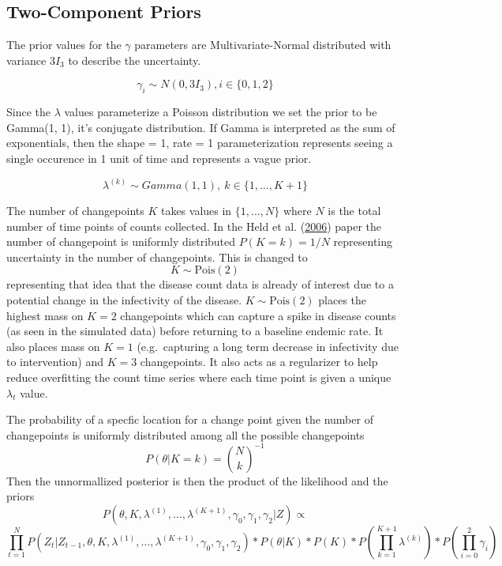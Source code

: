 \documentclass[]{article}
\numberwithin{equation}{section}
\begin{document}
\hypertarget{two-component-priors}{%
\subsection{Two-Component Priors}\label{two-component-priors}}

The prior values for the \(\gamma\) parameters are Multivariate-Normal
distributed with variance \(3I_3\) to describe the uncertainty.

\[\gamma_i \sim N(0, 3I_3), i \in \{0,1,2\}\]

Since the \(\lambda\) values parameterize a Poisson distribution we set
the prior to be Gamma(1, 1), it's conjugate distribution. If Gamma is
interpreted as the sum of exponentials, then the shape = 1, rate = 1
parameterization represents seeing a single occurence in 1 unit of time
and represents a vague prior.

\[ \lambda^{(k)} \sim Gamma(1, 1),\ k \in \{1, \dots, K + 1\} \]

The number of changepoints \(K\) takes values in \(\{1,\dots,N\}\) where
\(N\) is the total number of time points of counts collected. In the
Held et al. (\protect\hyperlink{ref-held_two-component_2006}{2006})
paper the number of changepoint is uniformly distributed
\(P(K = k) = 1/N\) representing uncertainty in the number of
changepoints. This is changed to \[K \sim \text{Pois}(2)\] representing
that idea that the disease count data is already of interest due to a
potential change in the infectivity of the disease.
\(K \sim\text{Pois}(2)\) places the highest mass on \(K = 2\)
changepoints which can capture a spike in disease counts (as seen in the
simulated data) before returning to a baseline endemic rate. It also
places mass on \(K = 1\) (e.g.~capturing a long term decrease in
infectivity due to intervention) and \(K = 3\) changepoints. It also
acts as a regularizer to help reduce overfitting the count time series
where each time point is given a unique \(\lambda_t\) value.

The probability of a specfic location for a change point given the
number of changepoints is uniformly distributed among all the possible
changepoints \[P(\theta|K=k) = \binom{N}{k}^{-1}\] Then the
unnormallized posterior is then the product of the likelihood and the
priors
\[ P(\theta, K, \lambda^{(1)}, \dots, \lambda^{(K+1)}, \gamma_0, \gamma_1, \gamma_2|Z)  \propto \]
\[\prod_{t=1}^N P(Z_t|Z_{t-1},\theta, K, \lambda^{(1)}, \dots, \lambda^{(K+1)}, \gamma_0, \gamma_1, \gamma_2)*P(\theta|K)*P(K)*P(\prod_{k=1}^{K+1}\lambda^{(k)} )*P(\prod_{i=0}^2 \gamma_i)  \]
\end{document}
